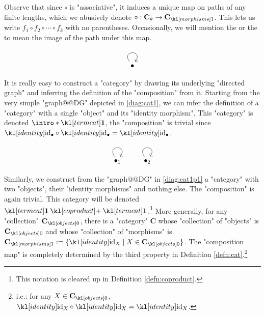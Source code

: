 \documentclass[main.tex]{subfiles}
\begin{document}
Observe that since $\circ$ is "associative", it induces a unique  map on paths of any finite lengths, which we abusively denote $\circ: \mathbf{C}_k \rightarrow \mor{\mathbf{C}}$. This lets us write $f_1 \circ f_2 \circ \cdots \circ f_k$ with no parentheses. \AP Occasionally, we will mention the  or the  to mean the image of the path under this map.
\begin{exmps}\label{exmp:simplecats}
	\begin{marginfigure}[5\baselineskip]\begin{equation}\label{diag:cat1}\begin{tikzcd}\bullet \arrow[loop, distance=2em, in=55, out=125]\end{tikzcd}\end{equation}\end{marginfigure} 
	It is really easy to construct a "category" by drawing its underlying "directed graph" and inferring the definition of the "composition" from it. Starting from the very simple "graph@@DG" depicted in \eqref{diag:cat1}, we can infer the definition of a "category" with a single "object" and its "identity morphism". \AP This "category" is denoted $\intro*\termcat$, the "composition" is trivial since $\id_{\bullet} \circ \id_{\bullet} = \id_{\bullet}$.

	\begin{marginfigure}[1\baselineskip]\begin{equation}\label{diag:cat1p1}\begin{tikzcd}\bullet_1 \arrow[loop, distance=2em, in=55, out=125]&\bullet_2 \arrow[loop, distance=2em, in=55, out=125]\end{tikzcd}\end{equation}\end{marginfigure}
	Similarly, we construct from the "graph@@DG" in \eqref{diag:cat1p1} a "category" with two "objects", their "identity morphisms" and nothing else. The "composition" is again trivial. This category will be denoted $\termcat \coproduct \termcat$.\footnote{This notation is cleared up in Definition \ref{defn:coproduct}.}
	More generally, for any "collection" $\obj{\mathbf{C}}$, there is a "category" $\mathbf{C}$ whose "collection" of "objects" is $\obj{\mathbf{C}}$ and whose "collection" of "morphisms" is $\mor{\mathbf{C}} := \{\id_X \mid X \in \obj{\mathbf{C}}\}$. The "composition map" is completely determined by the third property in Definition \ref{defn:cat}.\footnote{i.e.: for any $X \in \obj{\mathbf{C}}$, $\id_X \circ \id_X = \id_X$.}
	

\end{exmps}
\end{document}
